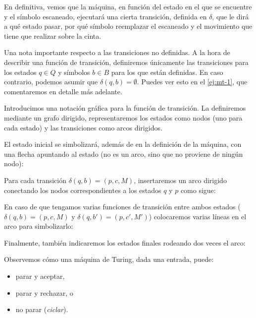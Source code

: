 En definitiva, vemos que la máquina, en función del estado en el que se encuentre y el símbolo escaneado, ejecutará una cierta transición, definida en $\delta$, que le dirá a qué estado pasar, por qué símbolo reemplazar el escaneado y el movimiento que tiene que realizar sobre la cinta.

Una nota importante respecto a las transiciones no definidas. A la hora de describir una función de transición, definiremos únicamente las transiciones para los estados $q\in Q$ y símbolos $b \in B$ para los que están definidas. En caso contrario, podemos asumir que \linebreak $\delta(q, b) = \emptyset$. Puedes ver esto en el \cref{ej:mt-1}, que comentaremos en detalle más adelante.


Introducimos una notación gráfica para la función de transición. La definiremos mediante un grafo dirigido, representaremos los estados como nodos (uno para cada estado) y las transiciones como arcos dirigidos.


El estado inicial se simbolizará, además de en la definición de la máquina, con una flecha apuntando al estado (no es un arco, sino que no proviene de ningún nodo):



Para cada transición $\delta(q,b)=(p,c,M)$, insertaremos un arco dirigido conectando los nodos correspondientes a los estados $q$ y $p$ como sigue:



En caso de que tengamos varias funciones de transición entre ambos estados ($\delta(q,b)=(p,c,M)$ y $\delta(q,b')=(p,c',M')$) colocaremos varias líneas en el arco para simbolizarlo:



Finalmente, también indicaremos los estados finales rodeando dos veces el arco:



Observemos cómo una máquina de Turing, dada una entrada, puede:
\begin{itemize}
    \item parar y aceptar,
    \item parar y rechazar, o
    \item no parar (\emph{ciclar}).
\end{itemize}

